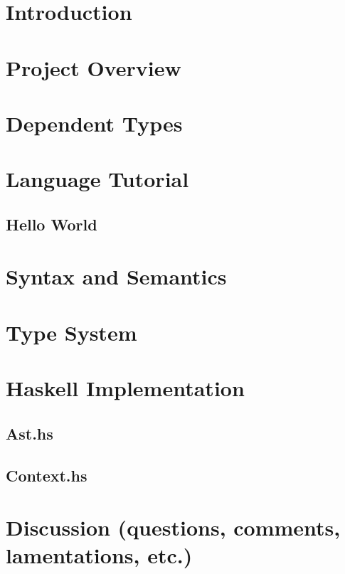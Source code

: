 \section{Introduction}
\section{Project Overview}
\section{Dependent Types}
\section{Language Tutorial}
\subsection{Hello World}
\section{Syntax and Semantics}
\section{Type System}
\section{Haskell Implementation}
\subsection{Ast.hs}
\subsection{Context.hs}
\section{Discussion (questions, comments, lamentations, etc.)}

